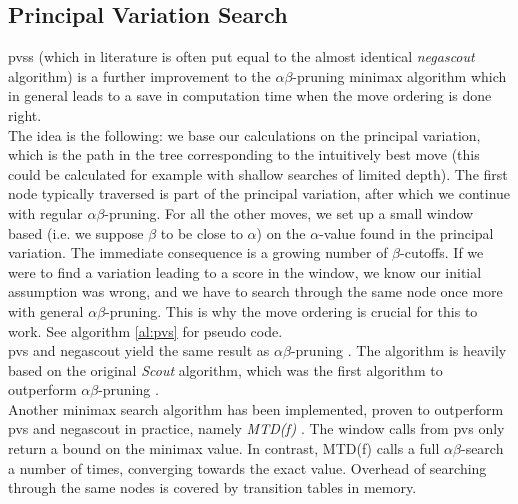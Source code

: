 \subsection{Principal Variation Search}
\label{subsec:pvs}
\glspl{pvs} (which in literature is often put equal to the almost identical \textit{negascout} algorithm) is a further improvement to the $\alpha \beta$-pruning minimax algorithm which in general leads to a save in computation time when the move ordering is done right. \\ 
The idea is the following: we base our calculations on the principal variation, which is the path in the tree corresponding to the intuitively best move (this could be calculated for example with shallow searches of limited depth). The first node typically traversed is part of the principal variation, after which we continue with regular $\alpha \beta$-pruning. For all the other moves, we set up a small window based (i.e. we suppose $\beta$ to be close to $\alpha$) on the $\alpha$-value found in the principal variation. The immediate consequence is a growing number of $\beta$-cutoffs. If we were to find a variation leading to a score in the window, we know our initial assumption was wrong, and we have to search through the same node once more with general $\alpha \beta$-pruning. This is why the move ordering is crucial for this to work. See algorithm \ref{al:pvs} for pseudo code.\\
\gls{pvs} and negascout yield the same result as $\alpha \beta$-pruning \cite{reine89}. The algorithm is heavily based on the original \textit{Scout} algorithm, which was the first algorithm to outperform $\alpha \beta$-pruning \cite{pearl80}. \\

Another minimax search algorithm has been implemented, proven to outperform \gls{pvs} and negascout in practice, namely \textit{MTD(f)} \cite{plaat96}. The window calls from \gls{pvs} only return a bound on the minimax value. In contrast, MTD(f) calls a full $\alpha \beta$-search a number of times, converging towards the exact value. Overhead of searching through the same nodes is covered by transition tables in memory.

